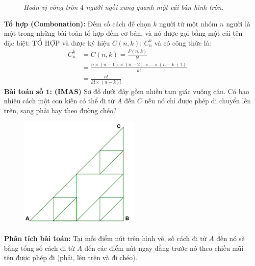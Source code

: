 \begin{multicols}{2}
\begin{figure}[H]
		\caption{\small\textit{\color{toancuabi}Hoán vị vòng tròn $4$ người ngồi xung quanh một cái bàn hình tròn.}}
		\vspace*{-15pt}
	\end{figure}
	\textbf{\color{toancuabi}Tổ hợp (Combonation):}  Đếm số cách để chọn $k$ người từ một nhóm $n$ người là một trong những bài toán tổ hợp đếm cơ bản, và nó được gọi bằng một cái tên đặc biệt: TỔ HỢP và được ký hiệu  $C(n,k)$; $C_n^k$ và có công thức là:
	\begin{align*}
		C_n^k&=C(n,k)=\frac{P(n,k)}{k!} \\[-0.5ex]
		&= \frac{n\!\times\!(n\!-\!1)\!\times\!(n\!-\!2)\!\times\!\ldots \!\times\!(n\!-\!k\!+\!1)}{k!}\\[-0.75ex]
		& = \frac{n!}{k!\times(n-k)!}
	\end{align*}
	\vskip 0.1cm
		\textbf{\color{toancuabi}Bài toán số $\pmb{1}$: (IMAS)}
		\vskip 0.1cm
		Sơ đồ dưới đây gồm nhiều tam giác vuông cân.
		\vskip 0.1cm
		Có bao nhiêu cách một con kiến có thể đi từ $A$ đến $C$ nếu nó chỉ được phép di chuyển lên trên, sang phải hay theo đường chéo? 
		\begin{figure}[H]
			\centering
			\vspace*{-5pt}
			\captionsetup{labelformat=empty, justification=centering}
			\includegraphics[width=0.75\linewidth]{_6}
			\vspace*{-15pt}
		\end{figure}
	\vskip 0.1cm
	\textbf{\color{toancuabi}Phân tích bài toán:} Tại mỗi điểm nút trên hình vẽ, số cách đi từ $A$ đến nó sẽ bằng tổng số cách đi từ $A$ đến các điểm nút ngay đằng trước nó theo chiều mũi tên được phép đi (phải, lên trên và đi chéo).

\end{multicols}
